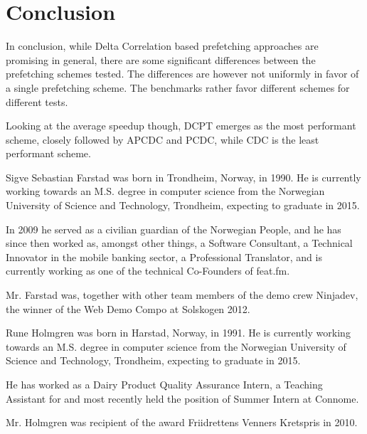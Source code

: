\documentclass[a4paper]{IEEEtran}
\begin{document}
\section{Conclusion}

In conclusion, while Delta Correlation based prefetching approaches are promising in general, there are some significant differences between the prefetching schemes tested.
The differences are however not uniformly in favor of a single prefetching scheme.
The benchmarks rather favor different schemes for different tests.

Looking at the average speedup though, DCPT emerges as the most performant scheme, closely followed by APCDC and PCDC, while CDC is the least performant scheme.




\nocite{*}

\begin{IEEEbiography}{Sigve Sebastian Farstad}
    was born in Trondheim, Norway, in 1990.
    He is currently working towards an M.S. degree in computer science from the Norwegian University of Science and Technology, Trondheim, expecting to graduate in 2015.

    In 2009 he served as a civilian guardian of the Norwegian People, and he has since then worked as, amongst other things, a Software Consultant, a Technical Innovator in the mobile banking sector, a Professional Translator, and is currently working as one of the technical Co-Founders of feat.fm.

    Mr. Farstad was, together with other team members of the demo crew Ninjadev, the winner of the Web Demo Compo at Solskogen 2012.
\end{IEEEbiography}

\begin{IEEEbiography}{Rune Holmgren}
    was born in Harstad, Norway, in 1991.
    He is currently working towards an M.S. degree in computer science from the Norwegian University of Science and Technology, Trondheim, expecting to graduate in 2015.

    He has worked as a Dairy Product Quality Assurance Intern, a Teaching Assistant for and most recently held the position of Summer Intern at Connome.

    Mr. Holmgren was recipient of the award Friidrettens Venners Kretspris in 2010.
\end{IEEEbiography}
\end{document}
